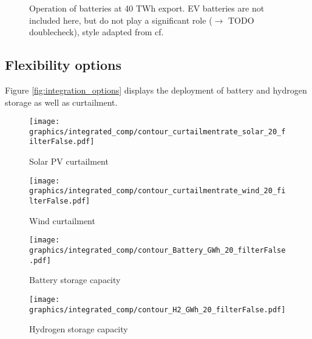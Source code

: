 \begin{figure}
    \caption{Operation of batteries at 40 TWh export. EV batteries are not included here, but do not play a significant role ($\rightarrow$ TODO doublecheck), style adapted from cf. \cite{Neumann2022}}
    \label{fig:battery_operation}
\end{figure}

\clearpage
\twocolumn











\subsection{Flexibility options}
Figure \ref{fig:integration_options} displays the deployment of battery and hydrogen storage as well as curtailment.

\begin{figure*}[t] %
    \centering
    \begin{subfigure}[b]{0.45\linewidth}
        \centering
        \texttt{[image: graphics/integrated\_comp/contour\_curtailmentrate\_solar\_20\_filterFalse.pdf]}
        \caption{Solar PV curtailment}
        \label{fig:solar_curt}
    \end{subfigure}
    \hfill
    \begin{subfigure}[b]{0.45\linewidth}
        \centering
        \texttt{[image: graphics/integrated\_comp/contour\_curtailmentrate\_wind\_20\_filterFalse.pdf]}
        \caption{Wind curtailment}
        \label{fig:wind_curt}
    \end{subfigure}
    \hfill
    \begin{subfigure}[b]{0.45\linewidth}
        \centering
        \texttt{[image: graphics/integrated\_comp/contour\_Battery\_GWh\_20\_filterFalse.pdf]}
        \caption{Battery storage capacity}
        \label{fig:battery_cap}
    \end{subfigure}
    \hfill
    \begin{subfigure}[b]{0.45\linewidth}
        \centering
        \texttt{[image: graphics/integrated\_comp/contour\_H2\_GWh\_20\_filterFalse.pdf]}
        \caption{Hydrogen storage capacity}
        \label{fig:hystorage_cap}
    \end{subfigure}
    \hfill

    \caption{Curtailment rates and storage capacities}
    \label{fig:integration_options}
\end{figure*}

